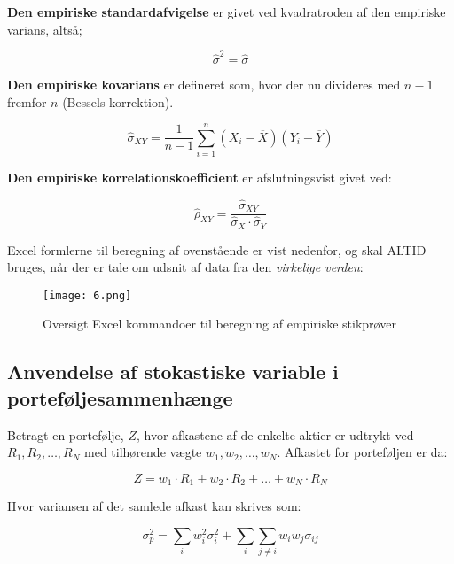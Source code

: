 \documentclass[10pt,reqno, usenames]{article}
\begin{document}
\textbf{Den empiriske standardafvigelse} er givet ved kvadratroden af den empiriske varians, altså; 

\begin{equation}
   \hat{\sigma}^2 = \hat{\sigma}
\end{equation}

\textbf{Den empiriske kovarians} er defineret som, hvor der nu divideres med $n-1$ fremfor $n$ (Bessels korrektion). 

\begin{equation}
    \hat{\sigma}_{XY} = \frac{1}{n - 1} \sum_{i=1}^{n} (X_i - \overline{X})(Y_i - \overline{Y})
\end{equation}

\textbf{Den empiriske korrelationskoefficient} er afslutningsvist givet ved: 

\begin{equation}
    \hat{\rho}_{XY} = \frac{\hat{\sigma}_{XY}}{\hat{\sigma}_X \cdot \hat{\sigma}_Y}
\end{equation}

Excel formlerne til beregning af ovenstående er vist nedenfor, og skal ALTID bruges, når der er tale om udsnit af data fra den \textit{virkelige verden}: 

\begin{figure}[h]
     \centering
     \texttt{[image: 6.png]}
     \caption{Oversigt Excel kommandoer til beregning af empiriske stikprøver}
     \label{Figur 2}
\end{figure} 

\subsection{Anvendelse af stokastiske variable i porteføljesammenhænge}
Betragt en portefølje, $Z$, hvor afkastene af de enkelte aktier er udtrykt ved $R_1, R_2, \ldots, R_N$ med tilhørende vægte $w_1, w_2,\ldots, w_N$. Afkastet for porteføljen er da: 

\begin{equation}
    Z = w_1 \cdot R_1 + w_2 \cdot R_2 + \ldots + w_N \cdot R_N
\end{equation}

Hvor variansen af det samlede afkast kan skrives som: 

\begin{equation}
    \sigma_p^2 = \sum_i w_i^2 \sigma_i^2 + \sum_i \sum_{j \neq i} w_i w_j \sigma_{ij}
\end{equation}
\end{document}

